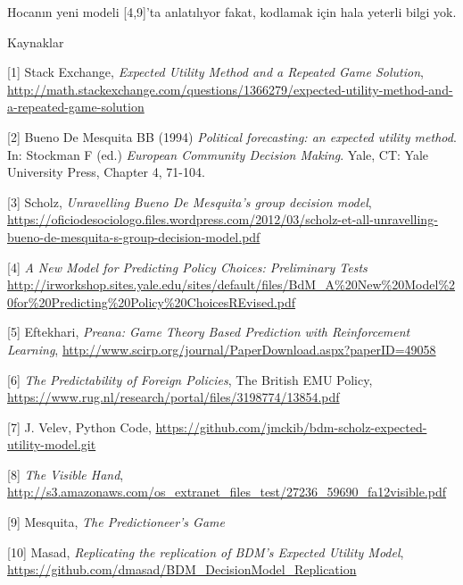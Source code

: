 \documentclass[12pt,fleqn]{article}\usepackage{../../common}
\begin{document}
Hocanın yeni modeli [4,9]'ta anlatılıyor fakat, kodlamak için hala yeterli bilgi
yok.

Kaynaklar 

[1] Stack Exchange, {\em Expected Utility Method and a Repeated Game Solution}, \url{http://math.stackexchange.com/questions/1366279/expected-utility-method-and-a-repeated-game-solution}

[2] Bueno De Mesquita BB (1994) {\em Political forecasting: an expected utility
method}. In: Stockman F (ed.) {\em European Community Decision Making}. Yale, CT:
Yale University Press, Chapter 4, 71-104.

[3] Scholz, {\em Unravelling Bueno De Mesquita's group decision model},
\url{https://oficiodesociologo.files.wordpress.com/2012/03/scholz-et-all-unravelling-bueno-de-mesquita-s-group-decision-model.pdf}

[4] {\em A New Model for Predicting Policy Choices: Preliminary Tests}
\url{http://irworkshop.sites.yale.edu/sites/default/files/BdM_A%20New%20Model%20for%20Predicting%20Policy%20ChoicesREvised.pdf}

[5] Eftekhari, {\em Preana: Game Theory Based Prediction with Reinforcement Learning}, \url{http://www.scirp.org/journal/PaperDownload.aspx?paperID=49058}

[6] {\em The Predictability of Foreign Policies}, The British EMU Policy,
\url{https://www.rug.nl/research/portal/files/3198774/13854.pdf}

[7] J. Velev, Python Code, \url{https://github.com/jmckib/bdm-scholz-expected-utility-model.git}

[8] {\em The Visible Hand}, \url{http://s3.amazonaws.com/os_extranet_files_test/27236_59690_fa12visible.pdf}

[9] Mesquita, {\em The Predictioneer's Game}

[10] Masad, {\em Replicating the replication of BDM's Expected Utility Model}, \url{https://github.com/dmasad/BDM_DecisionModel_Replication}
\end{document}
